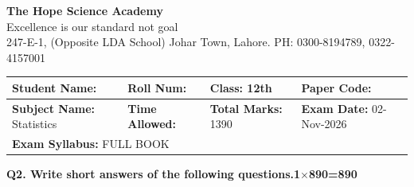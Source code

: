 \documentclass[11pt,a4paper]{article}
\begin{document}
\begin{center}
  {\Huge\bfseries The Hope Science Academy}\\[3pt]
  {\small Excellence is our standard not goal}\\[2pt]
  {\small 247-E-1, (Opposite LDA School) Johar Town, Lahore. PH: 0300-8194789, 0322-4157001}
\end{center}
\medskip\noindent
\begin{tabularx}{\linewidth}{|X|X|X|X|}
\hline
\textbf{Student Name:} & \textbf{Roll Num:} & \textbf{Class:} 12th & \textbf{Paper Code:} \\ \hline
\textbf{Subject Name:} Statistics & \textbf{Time Allowed:} & \textbf{Total Marks:} 1390 & \textbf{Exam Date:} 02-Nov-2026 \\ \hline
\multicolumn{4}{|l|}{\textbf{Exam Syllabus:} FULL BOOK} \\ \hline
\end{tabularx}
\bigskip
\noindent\textbf{Q2. Write short answers of the following questions.}\hfill\textbf{1$\times$890=890}
\end{document}
